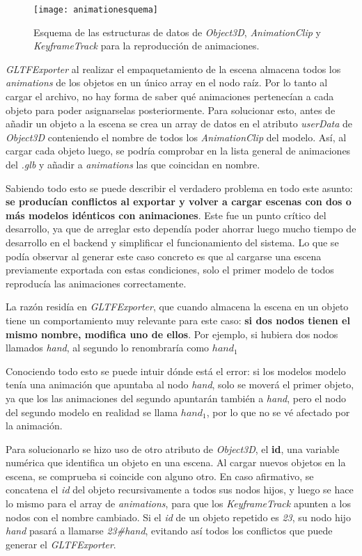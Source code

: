 \begin{figure}[h]
    \centering
    \texttt{[image: animationesquema]}
    \caption[Esquema de estructura de datos para animaciones]{Esquema de las estructuras de datos de \textit{Object3D}, \textit{AnimationClip} y \textit{KeyframeTrack} para la reproducción de animaciones.}
\end{figure}


\textit{GLTFExporter} al realizar el empaquetamiento de la escena almacena todos los \textit{animations} de los objetos en un único array en el nodo raíz. Por lo tanto al cargar el archivo, no hay forma de saber qué animaciones pertenecían a cada objeto para poder asignarselas posteriormente. Para solucionar esto, antes de añadir un objeto a la escena se crea un array de datos en el atributo \textit{userData} de \textit{Object3D} conteniendo el nombre de todos los \textit{AnimationClip} del modelo. Así, al cargar cada objeto luego, se podría comprobar en la lista general de animaciones del \textit{.glb} y añadir a \textit{animations} las que coincidan en nombre.

Sabiendo todo esto se puede describir el verdadero problema en todo este asunto: \textbf{se producían conflictos al exportar y volver a cargar escenas con dos o más modelos idénticos con animaciones}. Este fue un punto crítico del desarrollo, ya que de arreglar esto dependía poder ahorrar luego mucho tiempo de desarrollo en el backend y simplificar el funcionamiento del sistema. Lo que se podía observar al generar este caso concreto es que al cargarse una escena previamente exportada con estas condiciones, solo el primer modelo de todos reproducía las animaciones correctamente.

La razón residía en \textit{GLTFExporter}, que cuando almacena la escena en un objeto tiene un comportamiento muy relevante para este caso: \textbf{si dos nodos tienen el mismo nombre, modifica uno de ellos}. Por ejemplo, si hubiera dos nodos llamados \textit{hand}, al segundo lo renombraría como \textit{$hand_1$}

Conociendo todo esto se puede intuir dónde está el error: si los modelos modelo tenía una animación que apuntaba al nodo \textit{hand}, solo se moverá el primer objeto, ya que los las animaciones del segundo apuntarán también a \textit{hand}, pero el nodo del segundo modelo en realidad se llama \textit{$hand_1$}, por lo que no se vé afectado por la animación.

Para solucionarlo se hizo uso de otro atributo de \textit{Object3D}, el \textbf{id}, una variable numérica que identifica un objeto en una escena. Al cargar nuevos objetos en la escena, se comprueba si coincide con alguno otro. En caso afirmativo, se concatena el \textit{id} del objeto recursivamente a todos sus nodos hijos, y luego se hace lo mismo para el array de \textit{animations}, para que los \textit{KeyframeTrack} apunten a los nodos con el nombre cambiado. Si el \textit{id} de un objeto repetido es \textit{23}, su nodo hijo \textit{hand} pasará a llamarse \textit{23\#hand}, evitando así todos los conflictos que puede generar el \textit{GLTFExporter}.

